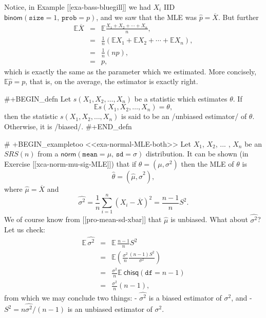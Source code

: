 Notice, in Example [[exa-bass-bluegill]] we had \(X_{i}\) IID
\(\mathsf{binom}(\mathtt{size}=1,\,\mathtt{prob}=p)\), and we saw that
the MLE was \(\hat{p}=\overline{X}\). But further
\begin{eqnarray*}
\mathbb{E}\overline{X} & = & \mathbb{E}\frac{X_{1}+X_{2}+\cdots+X_{n}}{n},\\
 & = & \frac{1}{n}\left(\mathbb{E} X_{1}+\mathbb{E} X_{2}+\cdots+\mathbb{E} X_{n}\right),\\
 & = & \frac{1}{n}\left(np\right),\\
 & = & p,
\end{eqnarray*}
which is exactly the same as the parameter which we estimated. More
concisely, \(\mathbb{E}\hat{p}=p\), that is, on the average, the
estimator is exactly right.

#+BEGIN_defn
Let \(s(X_{1},X_{2},\ldots,X_{n})\) be a statistic which estimates
\(\theta\). If \[ \mathbb{E} s(X_{1},X_{2},\ldots,X_{n})=\theta, \]
then the statistic \(s(X_{1},X_{2},\ldots,X_{n})\) is said to be an
/unbiased estimator/ of \(\theta\). Otherwise, it is /biased/.
#+END_defn

# +BEGIN_exampletoo
<<exa-normal-MLE-both>> Let \(X_{1}\), \(X_{2}\), ... , \(X_{n}\) be
an \(SRS(n)\) from a
\(\mathsf{norm}(\mathtt{mean}=\mu,\,\mathtt{sd}=\sigma)\)
distribution. It can be shown (in Exercise [[xca-norm-mu-sig-MLE]]) that
if \(\mbox{$\theta$}=(\mu,\sigma^{2})\) then the MLE of \(\theta\) is
\begin{equation}
\hat{\theta}=(\hat{\mu},\hat{\sigma}^{2}),
\end{equation}
where \(\hat{\mu}=\overline{X}\) and
\begin{equation}
\hat{\sigma^{2}}=\frac{1}{n}\sum_{i=1}^{n}\left(X_{i}-\overline{X}\right)^{2}=\frac{n-1}{n}S^{2}.
\end{equation}
We of course know from [[pro-mean-sd-xbar]] that \(\hat{\mu}\) is
unbiased. What about \(\hat{\sigma^{2}}\)? Let us check:
\begin{eqnarray*}
\mathbb{E}\,\hat{\sigma^{2}} & = & \mathbb{E}\,\frac{n-1}{n}S^{2}\\
 & = & \mathbb{E}\left(\frac{\sigma^{2}}{n}\frac{(n-1)S^{2}}{\sigma^{2}}\right)\\
 & = & \frac{\sigma^{2}}{n}\mathbb{E}\ \mathsf{chisq}(\mathtt{df}=n-1)\\
 & = & \frac{\sigma^{2}}{n}(n-1),
\end{eqnarray*}
from which we may conclude two things:
- \(\hat{\sigma^{2}}\) is a biased estimator of \(\sigma^{2}\), and
- \(S^{2}=n\hat{\sigma^{2}}/(n-1)\) is an unbiased estimator of
  \(\sigma^{2}\).

